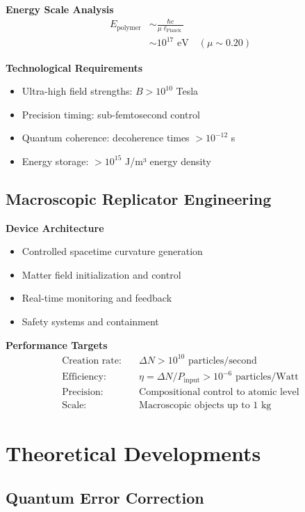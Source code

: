 \documentclass[11pt]{article}
\begin{document}
\textbf{Energy Scale Analysis}
\begin{align}
E_{\text{polymer}} &\sim \frac{\hbar c}{\mu \ell_{\text{Planck}}} \\
&\sim 10^{17} \text{ eV} \quad (\mu \sim 0.20)
\end{align}

\textbf{Technological Requirements}
\begin{itemize}
\item Ultra-high field strengths: $B > 10^{10}$ Tesla
\item Precision timing: sub-femtosecond control
\item Quantum coherence: decoherence times $> 10^{-12}$ s
\item Energy storage: $> 10^{15}$ J/m³ energy density
\end{itemize}

\subsection{Macroscopic Replicator Engineering}

\textbf{Device Architecture}
\begin{itemize}
\item Controlled spacetime curvature generation
\item Matter field initialization and control
\item Real-time monitoring and feedback
\item Safety systems and containment
\end{itemize}

\textbf{Performance Targets}
\begin{align}
\text{Creation rate:} &\quad \Delta N > 10^{10} \text{ particles/second} \\
\text{Efficiency:} &\quad \eta = \Delta N / P_{\text{input}} > 10^{-6} \text{ particles/Watt} \\
\text{Precision:} &\quad \text{Compositional control to atomic level} \\
\text{Scale:} &\quad \text{Macroscopic objects up to 1 kg}
\end{align}

\section{Theoretical Developments}

\subsection{Quantum Error Correction}
\end{document}

